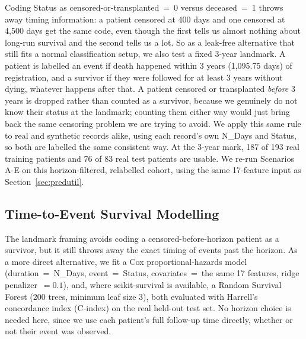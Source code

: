 \documentclass[journal]{IEEEtran}
\begin{document}
Coding Status as censored-or-transplanted~=~0 versus deceased~=~1 throws away timing information: a patient censored at 400 days and one censored at 4{,}500 days get the same code, even though the first tells us almost nothing about long-run survival and the second tells us a lot. So as a leak-free alternative that still fits a normal classification setup, we also test a fixed 3-year landmark. A patient is labelled an event if death happened within 3 years (1,095.75 days) of registration, and a survivor if they were followed for at least 3 years without dying, whatever happens after that. A patient censored or transplanted \emph{before} 3 years is dropped rather than counted as a survivor, because we genuinely do not know their status at the landmark; counting them either way would just bring back the same censoring problem we are trying to avoid. We apply this same rule to real and synthetic records alike, using each record's own N\_Days and Status, so both are labelled the same consistent way. At the 3-year mark, 187 of 193 real training patients and 76 of 83 real test patients are usable. We re-run Scenarios A-E on this horizon-filtered, relabelled cohort, using the same 17-feature input as Section~\ref{sec:predutil}.

\subsection{Time-to-Event Survival Modelling}
\label{sec:survival}

The landmark framing avoids coding a censored-before-horizon patient as a survivor, but it still throws away the exact timing of events past the horizon. As a more direct alternative, we fit a Cox proportional-hazards model (duration~=~N\_Days, event~=~Status, covariates~=~the same 17 features, ridge penalizer~$=0.1$), and, where scikit-survival is available, a Random Survival Forest (200 trees, minimum leaf size 3), both evaluated with Harrell's concordance index (C-index) on the real held-out test set. No horizon choice is needed here, since we use each patient's full follow-up time directly, whether or not their event was observed.
\end{document}
